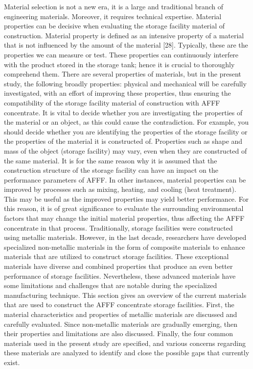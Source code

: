 \documentclass[12pt]{report}
\begin{document}
Material selection is not a new era, it is a large and traditional branch of engineering materials. Moreover, it requires technical expertise. Material properties can be decisive when evaluating the storage facility material of construction. Material property is defined as an intensive property of a material that is not influenced by the amount of the material [28]. Typically, these are the properties we can measure or test. These properties can continuously interfere with the product stored in the storage tank; hence it is crucial to thoroughly comprehend them. There are several properties of materials, but in the present study, the following broadly properties: physical and mechanical will be carefully investigated, with an effort of improving these properties, thus ensuring the compatibility of the storage facility material of construction with AFFF concentrate.
It is vital to decide whether you are investigating the properties of the material or an object, as this could cause the contradiction. For example, you should decide whether you are identifying the properties of the storage facility or the properties of the material it is constructed of. Properties such as shape and mass of the object (storage facility) may vary, even when they are constructed of the same material. It is for the same reason why it is assumed that the construction structure of the storage facility can have an impact on the performance parameters of AFFF.  In other instances, material properties can be improved by processes such as mixing, heating, and cooling (heat treatment). This may be useful as the improved properties may yield better performance. For this reason, it is of great significance to evaluate the surrounding environmental factors that may change the initial material properties, thus affecting the AFFF concentrate in that process.
Traditionally, storage facilities were constructed using metallic materials. However, in the last decade, researchers have developed specialized non-metallic materials in the form of composite materials to enhance materials that are utilized to construct storage facilities. These exceptional materials have diverse and combined properties that produce an even better performance of storage facilities. Nevertheless, these advanced materials have some limitations and challenges that are notable during the specialized manufacturing technique. 
This section gives an overview of the current materials that are used to construct the AFFF concentrate storage facilities. First, the material characteristics and properties of metallic materials are discussed and carefully evaluated. Since non-metallic materials are gradually emerging, then their properties and limitations are also discussed. Finally, the four common materials used in the present study are specified, and various concerns regarding these materials are analyzed to identify and close the possible gaps that currently exist.   
\end{document}
